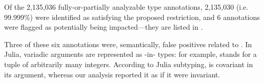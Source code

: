 


Of the 2,135,036 fully-or-partially analyzable type annotations,
2,135,030 (i.e. 99.999\%) were identified as satisfying the proposed restriction,
and 6 annotations were flagged as potentially being impacted---they are listed
in .

Three of these six annotations %
were, semantically, false positives related to . 
In Julia, variadic arguments are represented as
-in- types: for example, 
stands for a tuple of arbitrarily many integers. 
According to Julia subtyping,  is covariant in its argument,
whereas our analysis reported it as if it were invariant. 

